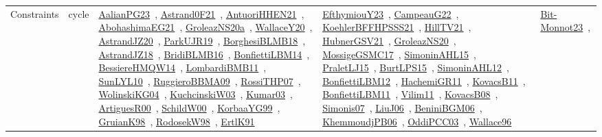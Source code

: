 {\begin{longtable}{lp{3cm}>{\raggedright\arraybackslash}p{6cm}>{\raggedright\arraybackslash}p{6cm}>{\raggedright\arraybackslash}p{8cm}}
Constraints & cycle & \href{papers/AalianPG23.pdf}{AalianPG23}~\cite{AalianPG23}, \href{papers/Astrand0F21.pdf}{Astrand0F21}~\cite{Astrand0F21}, \href{papers/AntuoriHHEN21.pdf}{AntuoriHHEN21}~\cite{AntuoriHHEN21}, \href{articles/AbohashimaEG21.pdf}{AbohashimaEG21}~\cite{AbohashimaEG21}, \href{papers/GroleazNS20a.pdf}{GroleazNS20a}~\cite{GroleazNS20a}, \href{articles/WallaceY20.pdf}{WallaceY20}~\cite{WallaceY20}, \href{articles/AstrandJZ20.pdf}{AstrandJZ20}~\cite{AstrandJZ20}, \href{papers/ParkUJR19.pdf}{ParkUJR19}~\cite{ParkUJR19}, \href{articles/BorghesiBLMB18.pdf}{BorghesiBLMB18}~\cite{BorghesiBLMB18}, \href{papers/AstrandJZ18.pdf}{AstrandJZ18}~\cite{AstrandJZ18}, \href{articles/BridiBLMB16.pdf}{BridiBLMB16}~\cite{BridiBLMB16}, \href{articles/BonfiettiLBM14.pdf}{BonfiettiLBM14}~\cite{BonfiettiLBM14}, \href{papers/BessiereHMQW14.pdf}{BessiereHMQW14}~\cite{BessiereHMQW14}, \href{papers/LombardiBMB11.pdf}{LombardiBMB11}~\cite{LombardiBMB11}, \href{papers/SunLYL10.pdf}{SunLYL10}~\cite{SunLYL10}, \href{articles/RuggieroBBMA09.pdf}{RuggieroBBMA09}~\cite{RuggieroBBMA09}, \href{papers/RossiTHP07.pdf}{RossiTHP07}~\cite{RossiTHP07}, \href{papers/WolinskiKG04.pdf}{WolinskiKG04}~\cite{WolinskiKG04}, \href{articles/KuchcinskiW03.pdf}{KuchcinskiW03}~\cite{KuchcinskiW03}, \href{papers/Kumar03.pdf}{Kumar03}~\cite{Kumar03}, \href{articles/ArtiguesR00.pdf}{ArtiguesR00}~\cite{ArtiguesR00}, \href{articles/SchildW00.pdf}{SchildW00}~\cite{SchildW00}, \href{papers/KorbaaYG99.pdf}{KorbaaYG99}~\cite{KorbaaYG99}, \href{papers/GruianK98.pdf}{GruianK98}~\cite{GruianK98}, \href{papers/RodosekW98.pdf}{RodosekW98}~\cite{RodosekW98}, \href{papers/ErtlK91.pdf}{ErtlK91}~\cite{ErtlK91} & \href{papers/EfthymiouY23.pdf}{EfthymiouY23}~\cite{EfthymiouY23}, \href{articles/CampeauG22.pdf}{CampeauG22}~\cite{CampeauG22}, \href{articles/KoehlerBFFHPSSS21.pdf}{KoehlerBFFHPSSS21}~\cite{KoehlerBFFHPSSS21}, \href{papers/HillTV21.pdf}{HillTV21}~\cite{HillTV21}, \href{articles/HubnerGSV21.pdf}{HubnerGSV21}~\cite{HubnerGSV21}, \href{papers/GroleazNS20.pdf}{GroleazNS20}~\cite{GroleazNS20}, \href{papers/MossigeGSMC17.pdf}{MossigeGSMC17}~\cite{MossigeGSMC17}, \href{articles/SimoninAHL15.pdf}{SimoninAHL15}~\cite{SimoninAHL15}, \href{papers/PraletLJ15.pdf}{PraletLJ15}~\cite{PraletLJ15}, \href{papers/BurtLPS15.pdf}{BurtLPS15}~\cite{BurtLPS15}, \href{papers/SimoninAHL12.pdf}{SimoninAHL12}~\cite{SimoninAHL12}, \href{papers/BonfiettiLBM12.pdf}{BonfiettiLBM12}~\cite{BonfiettiLBM12}, \href{articles/HachemiGR11.pdf}{HachemiGR11}~\cite{HachemiGR11}, \href{articles/KovacsB11.pdf}{KovacsB11}~\cite{KovacsB11}, \href{papers/BonfiettiLBM11.pdf}{BonfiettiLBM11}~\cite{BonfiettiLBM11}, \href{papers/Vilim11.pdf}{Vilim11}~\cite{Vilim11}, \href{articles/KovacsB08.pdf}{KovacsB08}~\cite{KovacsB08}, \href{articles/Simonis07.pdf}{Simonis07}~\cite{Simonis07}, \href{papers/LiuJ06.pdf}{LiuJ06}~\cite{LiuJ06}, \href{papers/BeniniBGM06.pdf}{BeniniBGM06}~\cite{BeniniBGM06}, \href{papers/KhemmoudjPB06.pdf}{KhemmoudjPB06}~\cite{KhemmoudjPB06}, \href{papers/OddiPCC03.pdf}{OddiPCC03}~\cite{OddiPCC03}, \href{articles/Wallace96.pdf}{Wallace96}~\cite{Wallace96} & \href{papers/Bit-Monnot23.pdf}{Bit-Monnot23}~\cite{Bit-Monnot23}, 
\end{longtable}}

